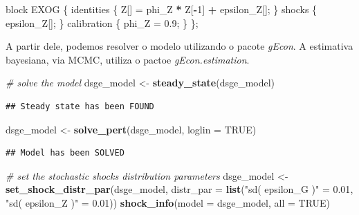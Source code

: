 \documentclass[12pt,a4paper,]{article}
\newcommand{\0}{\mathbf{0}}
\newenvironment{Shaded}{\begin{snugshade}}{\end{snugshade}}
\newcommand{\CommentTok}[1]{\textcolor[rgb]{0.56,0.35,0.01}{\textit{#1}}}
\newcommand{\DataTypeTok}[1]{\textcolor[rgb]{0.13,0.29,0.53}{#1}}
\newcommand{\DecValTok}[1]{\textcolor[rgb]{0.00,0.00,0.81}{#1}}
\newcommand{\FloatTok}[1]{\textcolor[rgb]{0.00,0.00,0.81}{#1}}
\newcommand{\KeywordTok}[1]{\textcolor[rgb]{0.13,0.29,0.53}{\textbf{#1}}}
\newcommand{\NormalTok}[1]{#1}
\newcommand{\OperatorTok}[1]{\textcolor[rgb]{0.81,0.36,0.00}{\textbf{#1}}}
\newcommand{\OtherTok}[1]{\textcolor[rgb]{0.56,0.35,0.01}{#1}}
\newcommand{\StringTok}[1]{\textcolor[rgb]{0.31,0.60,0.02}{#1}}
\begin{document}
\begin{Shaded}
\begin{Highlighting}[]
\NormalTok{block EXOG }
\NormalTok{\{}
\NormalTok{    identities}
\NormalTok{    \{    }
\NormalTok{        Z[] =}\StringTok{ }\NormalTok{phi_Z }\OperatorTok{*}\StringTok{ }\NormalTok{Z[}\OperatorTok{-}\DecValTok{1}\NormalTok{]  }\OperatorTok{+}\StringTok{ }\NormalTok{epsilon_Z[];}
\NormalTok{    \}}
\NormalTok{    shocks}
\NormalTok{    \{           }
\NormalTok{        epsilon_Z[];}
\NormalTok{    \}}
\NormalTok{    calibration}
\NormalTok{    \{}
\NormalTok{        phi_Z =}\StringTok{ }\FloatTok{0.9}\NormalTok{;}
\NormalTok{    \}}
\NormalTok{\};}
\end{Highlighting}
\end{Shaded}

A partir dele, podemos resolver o modelo utilizando o pacote
\textit{gEcon}. A estimativa bayesiana, via MCMC, utiliza o pactoe
\textit{gEcon.estimation}.

\begin{Shaded}
\begin{Highlighting}[]
\CommentTok{# solve the model}
\NormalTok{dsge_model <-}\StringTok{ }\KeywordTok{steady_state}\NormalTok{(dsge_model)}
\end{Highlighting}
\end{Shaded}

\begin{verbatim}
## Steady state has been FOUND
\end{verbatim}

\begin{Shaded}
\begin{Highlighting}[]
\NormalTok{dsge_model <-}\StringTok{ }\KeywordTok{solve_pert}\NormalTok{(dsge_model, }\DataTypeTok{loglin =} \OtherTok{TRUE}\NormalTok{)}
\end{Highlighting}
\end{Shaded}

\begin{verbatim}
## Model has been SOLVED
\end{verbatim}

\begin{Shaded}
\begin{Highlighting}[]
\CommentTok{# set the stochastic shocks distribution parameters}
\NormalTok{dsge_model <-}\StringTok{ }\KeywordTok{set_shock_distr_par}\NormalTok{(dsge_model,}
                                  \DataTypeTok{distr_par =} \KeywordTok{list}\NormalTok{(}\StringTok{"sd( epsilon_G )"}\NormalTok{ =}\StringTok{ }\FloatTok{0.01}\NormalTok{,}
                                                   \StringTok{"sd( epsilon_Z )"}\NormalTok{ =}\StringTok{ }\FloatTok{0.01}\NormalTok{))}
\KeywordTok{shock_info}\NormalTok{(}\DataTypeTok{model =}\NormalTok{ dsge_model, }\DataTypeTok{all =} \OtherTok{TRUE}\NormalTok{)}
\end{Highlighting}
\end{Shaded}
\end{document}
